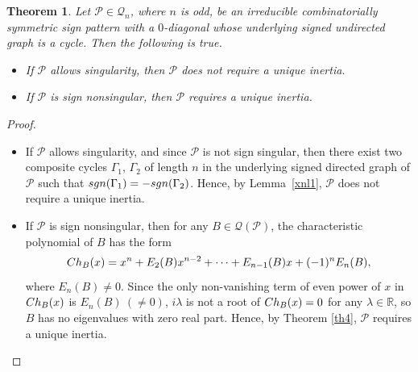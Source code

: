 \documentclass[10pt,a4paper]{amsart}
\newtheorem{theorem}{Theorem}[section]
\numberwithin{equation}{section}
\def\det{{\rm det}}
\def\sgn{{\rm sgn}}
\def\Ch{{\rm Ch}}
\begin{document}
\begin{theorem}\label{nth0.11}
	Let $\mathcal{P}\in \mathcal{Q}_n$, where $n$ is odd, be an irreducible combinatorially symmetric sign pattern with a $0$-diagonal whose underlying signed undirected graph is a cycle. Then the following is true.
	\begin{itemize}
		\item[i.] If $\mathcal{P}$ allows singularity, then $\mathcal{P}$ does not require a unique inertia.
		\item[ii.] If $\mathcal{P}$ is sign nonsingular, then $\mathcal{P}$ requires a unique inertia. 
	\end{itemize}
\end{theorem}
\begin{proof}
	\begin{itemize}
		\item[i.] If $\mathcal{P}$ allows singularity, and since $\mathcal{P}$ is not sign singular, then there exist two composite cycles $\Gamma_1$, $\Gamma_2$ of length $n$ in the underlying signed directed graph of $\mathcal{P}$ such that $\sgn(\Gamma_1) = -\sgn(\Gamma_2)$.
		Hence, by Lemma~\ref{xnl1}, $\mathcal{P}$ does not require a unique inertia.
		\item[ii.] If $\mathcal{P}$ is sign nonsingular, then for any $B\in \mathcal{Q}(\mathcal{P})$, the characteristic polynomial of $B$ has the form $$\Ch_B(x)=x^n+E_2(B)x^{n-2}+\cdots+E_{n-1}(B)x+(-1)^nE_n(B),$$ where $E_n(B)\neq 0$. Since the only non-vanishing term of even power of $x$ in $\Ch_B(x)$ is $E_n(B)~(\neq 0)$, $i\lambda$ is not a root of $\Ch_B(x)=0$ for any $\lambda\in\mathbb{R}$, so $B$ has no eigenvalues with zero real part. Hence, by Theorem \ref{th4}, $\mathcal{P}$ requires a unique inertia.
	\end{itemize}
\end{proof}
\end{document}
